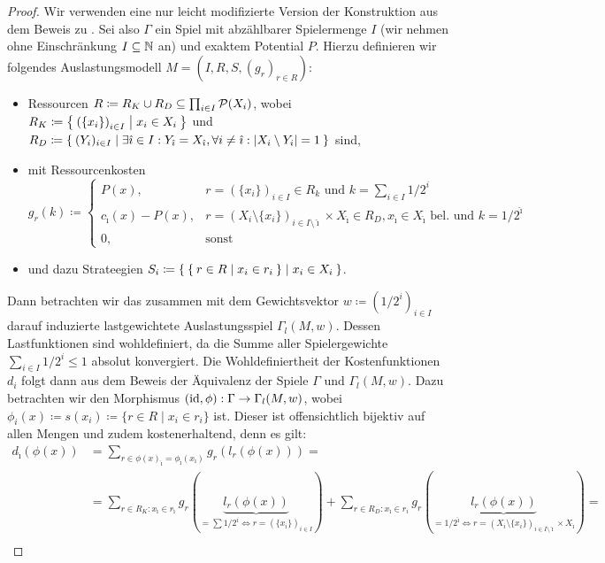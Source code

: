 \begin{proof}
	Wir verwenden eine nur leicht modifizierte Version der Konstruktion aus dem Beweis zu . Sei also $\Gamma$ ein Spiel mit abzählbarer Spielermenge $I$ (wir nehmen ohne Einschränkung $I \subseteq \mathbb{N}$ an) und exaktem Potential $P$. Hierzu definieren wir folgendes Auslastungsmodell $M = (I, R, S, (g_r)_{r \in R})$:
	\begin{itemize}
		\item Ressourcen $R \coloneqq R_K \cup R_D \subseteq \prod_{i \in I}\mathcal{P}(X_i)$, wobei $R_K \coloneqq \Set{\left(\{x_i\}\right)_{i \in I} | x_i \in X_i }$ und \\ $R_D \coloneqq \Set{(Y_i)_{i \in I} | \exists \hat{\imath} \in I: Y_{\hat{\imath}} = X_{\hat{\imath}}, \forall i \neq \hat{\imath}: \left|X_i \setminus Y_i\right| = 1 }$ sind,
		\item mit Ressourcenkosten
		\[g_r(k) \coloneqq 
		\begin{cases}
		P(x), 					&r = \left(\{x_i\}\right)_{i \in I} \in R_k 													\text{ und } k=\sum_{i \in I} 1/2^i \\
		c_{\hat{\imath}}(x) - P(x), 	&r = \left(X_i\setminus\{x_i\}\right)_{i \in I\setminus\hat{\imath}} \times X_{\hat{\imath}} \in R_D, x_{\hat{\imath}} \in X_{\hat{\imath}} \text{ bel. und } k=1/2^{\hat{\imath}} \\
		0,						&\text{sonst}
		\end{cases}
		\]
		\item und dazu Strateegien $S_i \coloneqq \Set{ \Set{r \in R | x_i \in r_i} | x_i \in X_i }$.
	\end{itemize}
	Dann betrachten wir das zusammen mit dem Gewichtsvektor $w \coloneqq (1/2^i)_{i \in I}$ darauf induzierte lastgewichtete Auslastungsspiel $\Gamma_l(M, w)$. Dessen Lastfunktionen sind wohldefiniert, da die Summe aller Spielergewichte $\sum_{i \in I} 1/2^i \leq 1$ absolut konvergiert. Die Wohldefiniertheit der Kostenfunktionen $d_i$ folgt dann aus dem Beweis der Äquivalenz der Spiele $\Gamma$ und $\Gamma_l(M, w)$. Dazu betrachten wir den Morphismus $(\mathrm{id}, \phi): \Gamma \to \Gamma_l(M, w)$, wobei $\phi_i(x) \coloneqq s(x_i) \coloneqq \{r \in R \mid x_i \in r_i\}$ ist. Dieser ist offensichtlich bijektiv auf allen Mengen und zudem kostenerhaltend, denn es gilt:
	\begin{align*}
	d_{\hat{\imath}}(\phi(x)) 	&=\sum_{r \in \phi(x)_{\hat{\imath}} = \phi_{\hat{\imath}}(x_{\hat{\imath}})} g_r(l_r(\phi(x))) = \\
	&=\sum_{r \in R_K: x_{\hat{\imath}} \in r_{\hat{\imath}}} g_r(\underbrace{l_r(\phi(x))}_{= \sum 1/2^i \Leftrightarrow r = \left(\{x_i\}\right)_{i \in I}}) + \sum_{r \in R_D: x_{\hat{\imath}} \in r_i} g_r(\underbrace{l_r(\phi(x))}_{=1/2^{\hat{\imath}} \Leftrightarrow r = \left(X_i\setminus\{x_i\}\right)_{i \in I\setminus\hat{\imath}} \times X_{\hat{\imath}}}) = \\

\end{align*}
\end{proof}
